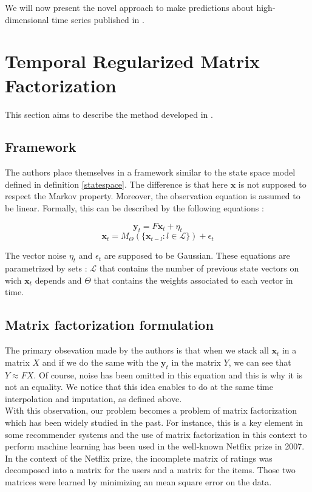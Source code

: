 \documentclass{article}
\begin{document}
We will now present the novel approach to make predictions about high-dimensional time series published in \cite{TRMF}.

\section{Temporal Regularized Matrix Factorization}
\label{sec:trmf}
This section aims to describe the method developed in \cite{TRMF}. \\

\subsection*{Framework}
The authors place themselves in a framework similar to the state space model defined in definition \ref{statespace}.
The difference is that here $\mathbf{x}$ is not supposed to respect the Markov property. Moreover, the observation equation is assumed to be linear.
Formally, this can be described by the following equations :

\begin{equation}
\mathbf{y}_t = F\mathbf{x}_t + \eta_t
\end{equation}
\begin{equation}
\mathbf{x}_t = M_{\Theta}(\{\mathbf{x}_{t-l} : l \in \mathcal{L} \}) + \epsilon_t
\label{eq:evol}
\end{equation}

The vector noise $\eta_t$ and $\epsilon_t$ are supposed to be Gaussian. These equations are parametrized by sets : $\mathcal{L}$ that contains the number of previous state vectors on wich $\mathbf{x}_t$ depends and $\Theta$ that contains the weights associated to each vector in time.

\subsection*{Matrix factorization formulation}
The primary obsevation made by the authors is that when we stack all $\mathbf{x}_t$ in a matrix $X$ and if we do the same with the $\mathbf{y}_t$ in the matrix $Y$, we can see that $Y \approx FX$. Of course, noise has been omitted in this equation and this is why it is not an equality. We notice that this idea enables to do at the same time interpolation and imputation, as defined above. \\

With this observation, our problem becomes a problem of matrix factorization which has been widely studied in the past. For instance, this is a key element in some recommender systems and the use of matrix factorization in this context to perform machine learning has been used in the well-known Netflix prize in 2007.
In the context of the Netflix prize, the incomplete matrix of ratings was decomposed into a matrix for the users and a matrix for the items. Those two matrices were learned by minimizing an mean square error on the data. \\
\end{document}

